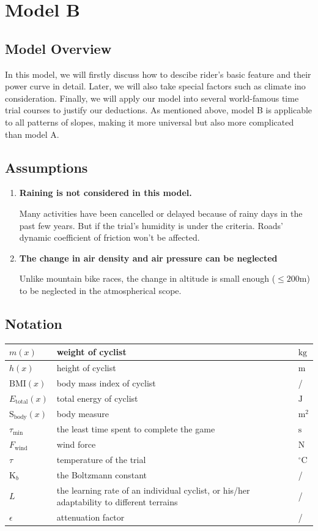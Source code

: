 \documentclass{article}
\begin{document}
	\section{Model B}
		\subsection{Model Overview}
			In this model, we will firstly discuss how to descibe rider's basic feature and their power curve in detail. Later, we will also take special factors such as climate ino consideration. Finally, we will apply our model into several world-famous time trial courses to justify our deductions. As mentioned above, model B is applicable to all patterns of slopes, making it more universal but also more complicated than model A.
		\subsection{Assumptions}
			\begin{enumerate}
				\item	\textbf{Raining is not considered in this model.}

						Many activities have been cancelled or delayed because of rainy days in the past few years. But if the trial's humidity is under the criteria. Roads' dynamic coefficient of friction won't be affected.
				\item \textbf{The change in air density and air pressure can be neglected}

						Unlike mountain bike races, the change in altitude is small enough (\(\leq 200\mathrm{m}\)) to be neglected in the atmospherical scope.

			\end{enumerate}
		\subsection{Notation}
			\begin{tabular}{|l|l|l|}
				\hline
				$m( x )$&weight of cyclist&$\mathrm{kg}$\\
				\hline
				$ h ( x )$&height of cyclist&$\mathrm{m}$\\
				\hline
				$\mathrm{BMI}( x )$&body mass index of cyclist&/\\
				\hline
				$ E _\mathrm{total} ( x )$&total energy of cyclist&$\mathrm{J}$\\
				\hline
				$\mathrm{S}_\mathrm{body}( x )$&body measure&$\mathrm{m}^2$\\
				\hline
				$\tau_{\mathrm{min}}$&the least time spent to complete the game&$\mathrm{s}$\\
				\hline
				$F_\mathrm{wind}$&wind force&$\mathrm{N}$\\
				\hline
				$\tau$&temperature of the trial&$^\circ\mathrm{C}$\\
				\hline
				$\mathrm{K}_ b $&the Boltzmann constant&/\\
				\hline
				\(L\) & the learning rate of an individual cyclist, or his/her adaptability to different terrains & /\\
				\hline
				\(\epsilon\) & attenuation factor & /\\
				\hline
			\end{tabular}
\end{document}
